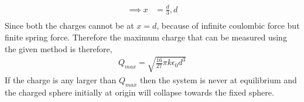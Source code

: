 \begin{problem}{}{}
\begin{enumerate}[(a)]
\begin{align*}
                \implies x &= \frac{d}{3}, d\\
            \end{align*}
        Since both the charges cannot be at $x = d$, because of infinite coulombic force but finite spring force. Therefore the maximum charge that can be measured using the given method is therefore, 
        \begin{align*}
            Q_{max} = \sqrt{\frac{16}{27}\pi k\epsilon_0d^3}
        \end{align*}
        If the charge is any larger than $Q_{max}$ then the system is never at equilibrium and the charged sphere initially at origin  will collapse towards the fixed sphere.
\end{enumerate}       
    
\end{problem}


